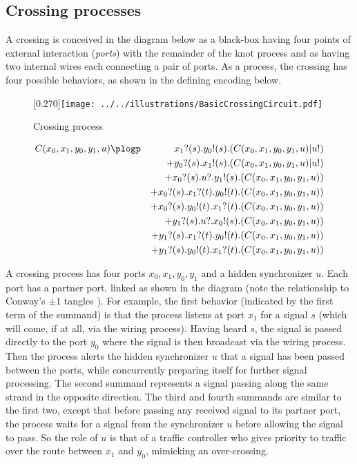 \subsection{Crossing processes}\label{sub:crossing_processes} %
A crossing is conceived in the diagram below as a black-box having
four points of external interaction (\emph{ports}) with the remainder
of the knot process and as having two internal wires each connecting a
pair of ports. As a process, the crossing has four possible behaviors,
as shown in the defining encoding below.
\begin{figure}[hbp]
    \centering
    \scalebox{0.27}[0.270]{\texttt{[image: ../../illustrations/BasicCrossingCircuit.pdf]}}
    \caption{ Crossing process }
\end{figure}
\begin{eqnarray*}
   C(x_0,x_1,y_0,y_1,u) & \plogp   & x_1?(s).y_0!(s).(C(x_0,x_1,y_0,y_1,u)|u!) \nonumber \\
  & & + y_0?(s).x_1!(s).(C(x_0,x_1,y_0,y_1,u)|u!) \nonumber \\
  & & + x_0?(s).u?.y_1!(s).(C(x_0,x_1,y_0,y_1,u)) \nonumber \\
  & & + x_0?(s).x_1?(t).y_0!(t).(C(x_0,x_1,y_0,y_1,u)) \nonumber \\
  & & + x_0?(s).y_0!(t).x_1?(t).(C(x_0,x_1,y_0,y_1,u)) \nonumber \\
  & & + y_1?(s).u?.x_0!(s).(C(x_0,x_1,y_0,y_1,u)) \nonumber \\
  & & + y_1?(s).x_1?(t).y_0!(t).(C(x_0,x_1,y_0,y_1,u)) \nonumber \\
  & & + y_1?(s).y_0!(t).x_1?(t).(C(x_0,x_1,y_0,y_1,u)) \nonumber 
\end{eqnarray*}

A crossing process has four ports $x_0,x_1,y_0,y_1$ and a hidden
synchronizer $u$. Each port has a partner port, linked as shown in the
diagram (note the relationship to Conway's $\pm 1$ tangles
\cite{Conway1970An-enumeration-}). For example, the first behavior (indicated by the first
term of the summand) is that the process listens at port $x_1$ for a
signal $s$ (which will come, if at all, via the wiring
process). Having heard $s$, the signal is passed directly to the port
$y_0$ where the signal is then broadcast via the wiring process. Then
the process alerts the hidden synchronizer $u$ that a signal has been
passed between the ports, while concurrently preparing itself for
further signal processing. The second summand represents a signal
passing along the same strand in the opposite direction. The third and
fourth summands are similar to the first two, except that before
passing any received signal to its partner port, the process waits for
a signal from the synchronizer $u$ before allowing the signal to
pass. So the role of $u$ is that of a traffic controller who gives
priority to traffic over the route between $x_1$ and $y_0$, mimicking
an over-crossing.

